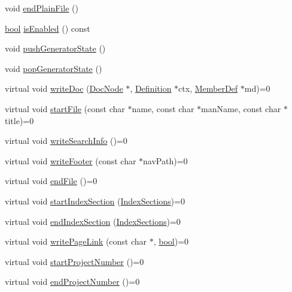 \begin{DoxyCompactItemize}
\item 
void \hyperlink{class_output_generator_aaacf2b4efc09a2c06b9dd8cc2af69046}{end\+Plain\+File} ()
\item 
\hyperlink{qglobal_8h_a1062901a7428fdd9c7f180f5e01ea056}{bool} \hyperlink{class_output_generator_a6758159bcacd76033b73d35603bc9ea8}{is\+Enabled} () const 
\item 
void \hyperlink{class_output_generator_a0e96bd0b61096478ec0eecfee3f609df}{push\+Generator\+State} ()
\item 
void \hyperlink{class_output_generator_ae8e915381e39d9c92674d7cb0e0e6589}{pop\+Generator\+State} ()
\item 
virtual void \hyperlink{class_output_generator_ac0b25a3af7edb8a631f21f34184f9a97}{write\+Doc} (\hyperlink{class_doc_node}{Doc\+Node} $\ast$, \hyperlink{class_definition}{Definition} $\ast$ctx, \hyperlink{class_member_def}{Member\+Def} $\ast$md)=0
\item 
virtual void \hyperlink{class_output_generator_a8c04cb480935a4f94b5391b97d01d5fb}{start\+File} (const char $\ast$name, const char $\ast$man\+Name, const char $\ast$title)=0
\item 
virtual void \hyperlink{class_output_generator_a6f93852b3d43ab8a63be1e46f10eb8fd}{write\+Search\+Info} ()=0
\item 
virtual void \hyperlink{class_output_generator_ac8f9e609b1f2633a07c5560cc1eb4dc9}{write\+Footer} (const char $\ast$nav\+Path)=0
\item 
virtual void \hyperlink{class_output_generator_acdf48180d14b1d720286049195ad1c6a}{end\+File} ()=0
\item 
virtual void \hyperlink{class_output_generator_ab8164b995688984ec7613485758a1af3}{start\+Index\+Section} (\hyperlink{index_8h_aec03800047ada46460eb75113cfee322}{Index\+Sections})=0
\item 
virtual void \hyperlink{class_output_generator_a04f3624f96d78d2cf07813e7ef759f3f}{end\+Index\+Section} (\hyperlink{index_8h_aec03800047ada46460eb75113cfee322}{Index\+Sections})=0
\item 
virtual void \hyperlink{class_output_generator_a92ddc60cab560b9e4a65bcd504cb779d}{write\+Page\+Link} (const char $\ast$, \hyperlink{qglobal_8h_a1062901a7428fdd9c7f180f5e01ea056}{bool})=0
\item 
virtual void \hyperlink{class_output_generator_aca2e001836d8cf6ae5e6d98bd9467b5b}{start\+Project\+Number} ()=0
\item 
virtual void \hyperlink{class_output_generator_abb659e1d0c5d99f3a85751a321bca262}{end\+Project\+Number} ()=0

\end{DoxyCompactItemize}
